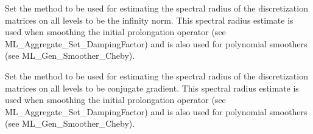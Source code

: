 
\vspace{2em}
{ \hrulefill}
\vspace{1em}

Set the method to be used for estimating the spectral 
radius of the discretization matrices on all levels
to be
the infinity norm. This spectral radius estimate is used when smoothing
the initial prolongation operator  (see ML\_Aggregate\_Set\_DampingFactor)
and is also used for polynomial smoothers
(see ML\_Gen\_Smoother\_Cheby).

\vspace{2em}
{ \hrulefill}
\vspace{1em}




\vspace{2em}
{ \hrulefill}
\vspace{1em}

Set the method to be used for estimating the spectral
radius of the discretization matrices on all levels
to be
conjugate gradient. This spectral radius estimate is used when smoothing
the initial prolongation operator  (see ML\_Aggregate\_Set\_DampingFactor)
and is also used for polynomial smoothers
(see ML\_Gen\_Smoother\_Cheby).

\vspace{2em}
{ \hrulefill}
\vspace{1em}


